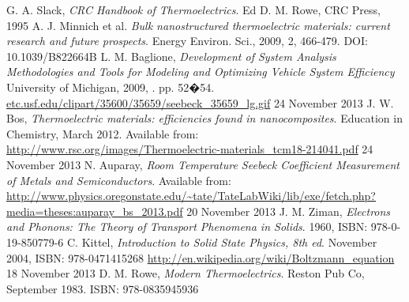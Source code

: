 \documentclass[a4paper,10pt,journal]{IEEEtran}
\begin{document}

\begin{thebibliography}{5}
G. A. Slack, \emph{CRC Handbook of Thermoelectrics}. Ed D. M. Rowe, CRC Press, 1995
A. J. Minnich et al. \emph{Bulk nanostructured thermoelectric
materials: current research and future prospects}. Energy Environ.
Sci., 2009, 2, 466-479. DOI: 10.1039/B822664B
L. M. Baglione, \emph{Development of System Analysis Methodologies and Tools for Modeling and Optimizing Vehicle System Efficiency} University of Michigan, 2009, . pp. 52�54.
\url{etc.usf.edu/clipart/35600/35659/seebeck_35659_lg.gif} 24 November
2013
J. W. Bos, \emph{Thermoelectric materials: efficiencies found in
nanocomposites}. Education in Chemistry, March 2012. Available
from:
\url{http://www.rsc.org/images/Thermoelectric-materials_tcm18-214041.pdf} 24 November 2013
N. Auparay, \emph{Room Temperature Seebeck Coefficient Measurement
of Metals and Semiconductors}. Available
from:
\url{http://www.physics.oregonstate.edu/~tate/TateLabWiki/lib/exe/fetch.php?media=theses:auparay_bs_2013.pdf} 20 November 2013
J. M. Ziman, \emph{Electrons and Phonons: The Theory of Transport
Phenomena in Solids}. 1960, ISBN: 978-0-19-850779-6
C. Kittel, \emph{Introduction to Solid State Physics, 8th ed}. November 2004, ISBN: 978-0471415268
\url{http://en.wikipedia.org/wiki/Boltzmann_equation} 18 November 2013
D. M. Rowe, \emph{Modern Thermoelectrics}. Reston Pub Co, September
1983. ISBN: 978-0835945936
\end{thebibliography}
\end{document}
